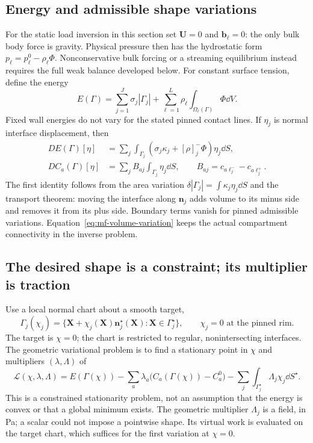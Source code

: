 \subsection{Energy and admissible shape variations}
For the static load inversion in this section set $\mathbf U=0$ and
$\mathbf b_\ell=0$: the only bulk body force is gravity. Physical pressure
then has the hydrostatic form $p_\ell=p_\ell^0-\rho_\ell\Phi$.
Nonconservative bulk forcing or a streaming equilibrium instead requires
the full weak balance developed below.
For constant surface tension, define the energy
\begin{equation}\label{eq:mf-energy}
 E(\Gamma)=\sum_{j=1}^J\sigma_j|\Gamma_j|
 +\sum_{\ell=1}^L\rho_\ell\int_{\Omega_\ell(\Gamma)}\Phi\dd V.
\end{equation}
Fixed wall energies do not vary for the stated pinned contact lines. If
$\eta_j$ is normal interface displacement, then
\begin{align}
 DE(\Gamma)[\eta]
 &=\sum_j\int_{\Gamma_j}
 (\sigma_j\kappa_j+[\rho]_j^-\Phi)\eta_j\dd S,
 \label{eq:mf-first-variation}\\
 DC_a(\Gamma)[\eta]
 &=\sum_j B_{aj}\int_{\Gamma_j}\eta_j\dd S,
 \qquad B_{aj}=c_{a\ell_j^-}-c_{a\ell_j^+}.
 \label{eq:mf-volume-variation}
\end{align}
The first identity follows from the area variation
$\delta|\Gamma_j|=\int\kappa_j\eta_j\dd S$ and the transport theorem:
moving the interface along $\mathbf n_j$ adds volume to its minus side and
removes it from its plus side. Boundary terms vanish for pinned admissible
variations. Equation~\eqref{eq:mf-volume-variation} keeps the actual
compartment connectivity in the inverse problem.

\subsection{The desired shape is a constraint; its multiplier is traction}
Use a local normal chart about a smooth target,
\begin{equation}\label{eq:mf-normal-chart}
 \Gamma_j(\chi_j)=\{\mathbf X+\chi_j(\mathbf X)\mathbf n_j^\star(\mathbf X):
 \mathbf X\in\Gamma_j^\star\},\qquad \chi_j=0\text{ at the pinned rim}.
\end{equation}
The target is $\chi=0$; the chart is restricted to regular, nonintersecting
interfaces. The geometric variational problem is to find a stationary
point in $\chi$ and multipliers $(\lambda,\Lambda)$ of
\begin{equation}\label{eq:mf-shape-lagrangian}
 \boxed{\mathscr L(\chi,\lambda,\Lambda)=E(\Gamma(\chi))
 -\sum_a\lambda_a\big(C_a(\Gamma(\chi))-C_a^0\big)
 -\sum_j\int_{\Gamma_j^\star}\Lambda_j\chi_j\dd S^\star.}
\end{equation}
This is a constrained stationarity problem, not an assumption that the
energy is convex or that a global minimum exists. The geometric multiplier
$\Lambda_j$ is a field, in Pa; a scalar could not impose a pointwise shape.
Its virtual work is evaluated on the target chart, which suffices for the
first variation at $\chi=0$.

